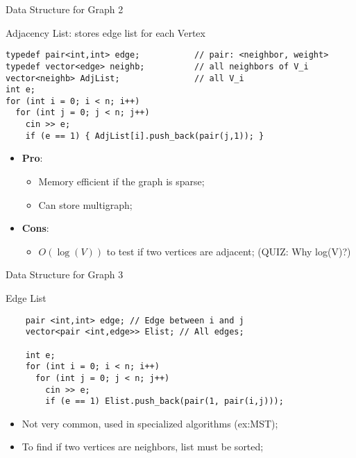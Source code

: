 \begin{frame}[fragile]{Data Structure for Graph 2}

  \begin{block}{Adjacency List: stores edge list for each Vertex}
      {\smaller
\begin{verbatim}
typedef pair<int,int> edge;           // pair: <neighbor, weight>
typedef vector<edge> neighb;          // all neighbors of V_i
vector<neighb> AdjList;               // all V_i
int e;
for (int i = 0; i < n; i++)
  for (int j = 0; j < n; j++)
    cin >> e;
    if (e == 1) { AdjList[i].push_back(pair(j,1)); }
\end{verbatim}}

\begin{itemize}
  \item {\bf Pro}:
    \begin{itemize}
      \item Memory efficient if the graph is sparse;
      \item Can store multigraph;
    \end{itemize}
  \item {\bf Cons}:
  \begin{itemize}
    \item $O(\log(V))$ to test if two vertices are adjacent; (QUIZ: Why log(V)?)
  \end{itemize}
\end{itemize}
  \end{block}
\end{frame}

\begin{frame}[fragile]{Data Structure for Graph 3}
  \begin{block}{Edge List}
    {\smaller
    \begin{verbatim}
    pair <int,int> edge; // Edge between i and j
    vector<pair <int,edge>> Elist; // All edges;

    int e;
    for (int i = 0; i < n; i++)
      for (int j = 0; j < n; j++)
        cin >> e;
        if (e == 1) Elist.push_back(pair(1, pair(i,j)));
    \end{verbatim}}
    \begin{itemize}
      \item Not very common, used in specialized algorithms (ex:MST);
      \item To find if two vertices are neighbors, list must be sorted;
    \end{itemize}
  \end{block}
\end{frame}


